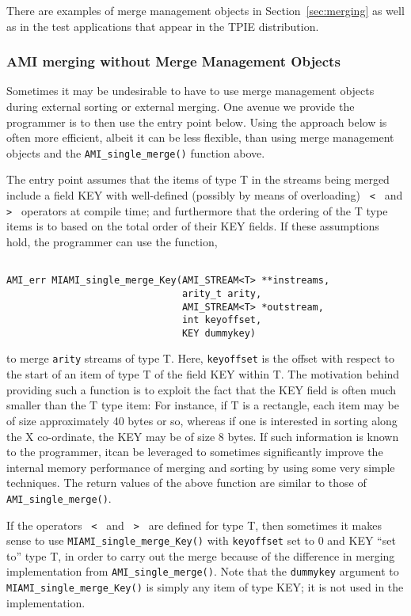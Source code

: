 There are examples of merge management objects in
Section~\ref{sec:merging} as well as in the test applications that
appear in the TPIE distribution.


\subsubsection{AMI merging without Merge Management Objects}
\label{sec:ref-miami-merge}
Sometimes it may be undesirable to have to use merge management
objects during external sorting or external merging. One avenue
we provide the programmer is to then use the entry point below.
Using the approach below is often more efficient, albeit it can
be less flexible, than using merge management objects and the 
\verb|AMI_single_merge()| function above.

The entry point assumes that the items of type T in the streams being
merged include a field KEY with well-defined (possibly by means of
overloading)  \verb| < | and \verb| > | operators at compile time; and
furthermore that the ordering of the T type items is to based on the
total order of their KEY fields. If these assumptions hold, the
programmer can use the function,

\begin{verbatim}

AMI_err MIAMI_single_merge_Key(AMI_STREAM<T> **instreams, 
                               arity_t arity, 
                               AMI_STREAM<T> *outstream, 
                               int keyoffset, 
                               KEY dummykey)
\end{verbatim}

to merge {\tt arity} streams of type T. Here, {\tt keyoffset} is the
offset with respect to the start of an item of type T of the field KEY
within T. The motivation behind providing such a function is to 
exploit the fact that the KEY field is often much smaller than the
T type item: For instance, if T is a rectangle, each item may be of 
size approximately 40 bytes or so, whereas if one is interested in
sorting along the X co-ordinate, the KEY may be of size 8 bytes.
If such information is known to the programmer, itcan be leveraged to 
sometimes significantly improve the internal memory performance of 
merging and sorting by using some very simple techniques. The return
values of the above function are  similar to those of
\verb|AMI_single_merge()|. 

If the operators \verb| < | and \verb| > |  are defined for type T,
then sometimes it makes sense to use \verb|MIAMI_single_merge_Key()|
with {\tt keyoffset} set to 0 and KEY ``set to'' type T, 
in order to carry out the merge
because of the difference in merging implementation from
\verb|AMI_single_merge()|. Note that the {\tt dummykey} argument
to \verb|MIAMI_single_merge_Key()| is simply any item of type 
KEY; it is not used in the implementation.

